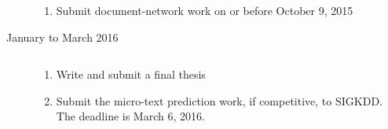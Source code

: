\begin{description}
\begin{enumerate}
    \item Submit document-network work on or before October 9, 2015
\end{enumerate}
\item[January to March 2016] $\text{ }$\\
    \begin{enumerate}
        \item Write and submit a final thesis
        \item Submit the micro-text prediction work, if competitive, to SIGKDD. The deadline is March 6, 2016. 
    \end{enumerate}
\end{description}


